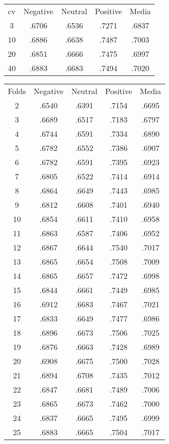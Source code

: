 \documentclass[a4paper,10pt]{article} %
\begin{document}
\begin{tabular} {ccccc}
    cv & Negative & Neutral & Positive & Media \\
    3  & .6706 & .6536 & .7271 & .6837  \\
    10 & .6886 & .6638 & .7487 & .7003  \\
    20 & .6851 & .6666 & .7475 & .6997  \\
    40 & .6883 & .6683 & .7494 & .7020  \\
\end{tabular}

\begin{tabular} {ccccc}
    Folds & Negative & Neutral & Positive & Media  \\
    2     & .6540    & .6391   & .7154    & .6695  \\
    3     & .6689    & .6517   & .7183    & .6797  \\
    4     & .6744    & .6591   & .7334    & .6890  \\
    5     & .6782    & .6552   & .7386    & .6907  \\
    6     & .6782    & .6591   & .7395    & .6923  \\
    7     & .6805    & .6522   & .7414    & .6914  \\
    8     & .6864    & .6649   & .7443    & .6985  \\
    9     & .6812    & .6608   & .7401    & .6940  \\
    10    & .6854    & .6611   & .7410    & .6958  \\
    11    & .6863    & .6587   & .7406    & .6952  \\
    12    & .6867    & .6644   & .7540    & .7017  \\
    13    & .6865    & .6654   & .7508    & .7009  \\
    14    & .6865    & .6657   & .7472    & .6998  \\
    15    & .6844    & .6661   & .7449    & .6985  \\
    16    & .6912    & .6683   & .7467    & .7021  \\
    17    & .6833    & .6649   & .7477    & .6986  \\
    18    & .6896    & .6673   & .7506    & .7025  \\
    19    & .6876    & .6663   & .7428    & .6989  \\
    20    & .6908    & .6675   & .7500    & .7028  \\
    21    & .6894    & .6708   & .7435    & .7012  \\
    22    & .6847    & .6681   & .7489    & .7006  \\
    23    & .6865    & .6673   & .7462    & .7000  \\
    24    & .6837    & .6665   & .7495    & .6999  \\
    25    & .6883    & .6665   & .7504    & .7017  \\
\end{tabular}
\end{document}

